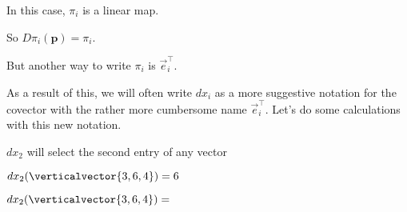 \documentclass{ximera}
\begin{document}
\begin{question}
\begin{solution}
    \begin{hint}
      In this case, $\pi_i$ is a linear map.
    \end{hint}

    \begin{hint}
      So $D\pi_i(\mathbf{p}) = \pi_i$.
    \end{hint}

    \begin{hint}
      But another way to write $\pi_i$ is $\vec{e}_i^\top$.
    \end{hint}
    \begin{multiple-choice}
    \end{multiple-choice}
  \end{solution}
  
  As a result of this, we will often write $dx_i$ as a more suggestive notation for the covector with the rather more cumbersome name $\vec{e}_i^\top$.  Let's do some calculations with this new notation.
	
  \begin{solution}
    \begin{hint}
      $dx_2$ will select the second entry of any vector 
    \end{hint}
    \begin{hint}
      $dx_2(\verticalvector{3,6,4})=6$
    \end{hint}
    $dx_2(\verticalvector{3,6,4})=$ 
  \end{solution}


\end{question}
\end{document}
